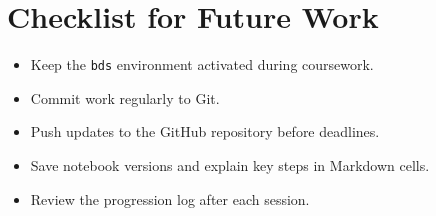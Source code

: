 \documentclass[11pt,a4paper]{article}
\begin{document}
\section{Checklist for Future Work}
\begin{itemize}[leftmargin=1.5em]
    \item Keep the \texttt{bds} environment activated during coursework.
    \item Commit work regularly to Git.
    \item Push updates to the GitHub repository before deadlines.
    \item Save notebook versions and explain key steps in Markdown cells.
    \item Review the progression log after each session.
\end{itemize}
\end{document}
